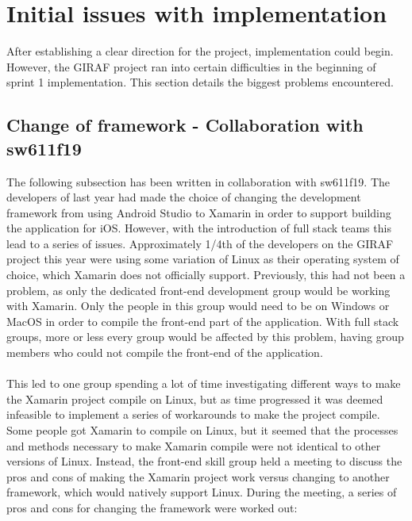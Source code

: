\section{Initial issues with implementation}
After establishing a clear direction for the project, implementation could begin.
However, the GIRAF project ran into certain difficulties in the beginning of sprint 1 implementation.
This section details the biggest problems encountered.

\subsection{Change of framework - Collaboration with sw611f19}\label{change-of-framework}
The following subsection has been written in collaboration with sw611f19.
The developers of last year had made the choice of changing the development framework from using Android Studio to Xamarin in order to support building the application for iOS.
However, with the introduction of full stack teams this lead to a series of issues. Approximately 1/4th of the developers on the GIRAF project this year were using some variation of Linux as their operating system of choice, which Xamarin does not officially support.
Previously, this had not been a problem, as only the dedicated front-end development group would be working with Xamarin. 
Only the people in this group would need to be on Windows or MacOS in order to compile the front-end part of the application.
With full stack groups, more or less every group would be affected by this problem, having group members who could not compile the front-end of the application.
\\\\
This led to one group spending a lot of time investigating different ways to make the Xamarin project compile on Linux, but as time progressed it was deemed infeasible to implement a series of workarounds to make the project compile.
Some people got Xamarin to compile on Linux, but it seemed that the processes and methods necessary to make Xamarin compile were not identical to other versions of Linux.
Instead, the front-end skill group held a meeting to discuss the pros and cons of making the Xamarin project work versus changing to another framework, which would natively support Linux.
During the meeting, a series of pros and cons for changing the framework were worked out:

